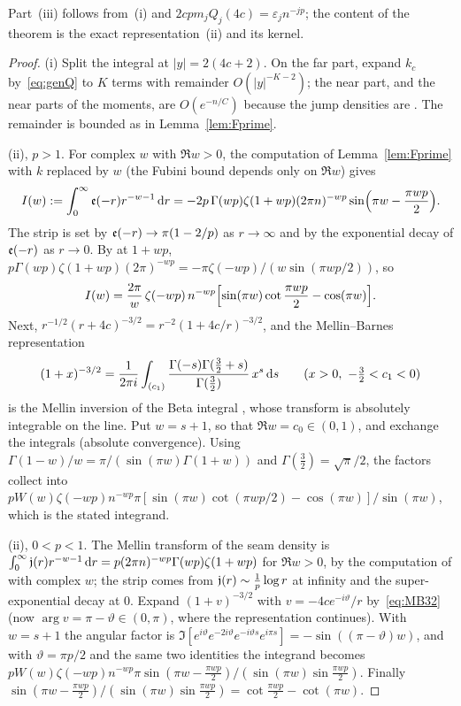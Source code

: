 Part~(iii) follows from~(i) and $2cpm_jQ_j(4c)=\varepsilon_jn^{-jp}$; the content of the theorem is the exact
representation~(ii) and its kernel.

\begin{proof}
(i) Split the integral at $|y|=2(4c+2)$. On the far part, expand $k_c$ by~\eqref{eq:genQ} to $K$ terms with remainder
$O(|y|^{-K-2})$; the near part, and the near parts of the moments, are $O(e^{-n/C})$ because the jump densities are
\cite[Lemmas~8.1(i) and~10.1]{PaperII}. The remainder is bounded as in Lemma~\ref{lem:Fprime}.

(ii), $p>1$. For complex $w$ with $\Re w>0$, the computation of Lemma~\ref{lem:Fprime} with $k$ replaced by $w$ (the
Fubini bound depends only on $\Re w$) gives
\[
  I(w):=\int_0^\infty\mathfrak e(-r)r^{-w-1}\,\mathrm{d} r=-2p\,\Gamma(wp)\zeta(1+wp)(2\pi n)^{-wp}\sin\Bigl(\pi w-\frac{\pi wp}2\Bigr).
\]
The strip is set by $\mathfrak e(-r)\to\pi(1-2/p)$ as $r\to\infty$ and by the exponential decay of $\mathfrak e(-r)$ as $r\to0$. By
\cite[(25.4.1)]{DLMF} at $1+wp$, $p\Gamma(wp)\zeta(1+wp)(2\pi)^{-wp}=-\pi\zeta(-wp)/(w\sin(\pi wp/2))$, so
\[
  I(w)=\frac{2\pi}w\,\zeta(-wp)\,n^{-wp}\Bigl[\sin(\pi w)\cot\frac{\pi wp}2-\cos(\pi w)\Bigr].
\]
Next, $r^{-1/2}(r+4c)^{-3/2}=r^{-2}(1+4c/r)^{-3/2}$, and the Mellin--Barnes representation
\begin{equation}\label{eq:MB32}
  (1+x)^{-3/2}=\frac1{2\pi i}\int_{(c_1)}\frac{\Gamma(-s)\Gamma(\frac32+s)}{\Gamma(\frac32)}\,x^s\,\mathrm{d} s\qquad
  (x>0,\ -\tfrac32<c_1<0)
\end{equation}
is the Mellin inversion of the Beta integral \cite[(5.12.3)]{DLMF}, whose transform is absolutely integrable on the line.
Put $w=s+1$, so that $\Re w=c_0\in(0,1)$, and exchange the integrals (absolute convergence). Using
$\Gamma(1-w)/w=\pi/(\sin(\pi w)\Gamma(1+w))$ and $\Gamma(\frac32)=\sqrt\pi/2$, the factors collect into
$pW(w)\zeta(-wp)n^{-wp}\pi[\sin(\pi w)\cot(\pi wp/2)-\cos(\pi w)]/\sin(\pi w)$, which is the stated integrand.

(ii), $0<p<1$. The Mellin transform of the seam density is $\int_0^\infty\mathfrak j(r)r^{-w-1}\,\mathrm{d} r=p(2\pi n)^{-wp}\Gamma(wp)\zeta(1+wp)$
for $\Re w>0$, by the computation of \cite[Lemma~10.1(iii)]{PaperII} with complex $w$; the strip comes from
$\mathfrak j(r)\sim\frac1p\log r$ at infinity and the super-exponential decay at $0$. Expand $(1+v)^{-3/2}$ with
$v=-4ce^{-i\vartheta}/r$ by~\eqref{eq:MB32} (now $\arg v=\pi-\vartheta\in(0,\pi)$, where the representation continues). With
$w=s+1$ the angular factor is $\Im[e^{i\vartheta}e^{-2i\vartheta}e^{-i\vartheta s}e^{i\pi s}]=-\sin((\pi-\vartheta)w)$, and with
$\vartheta=\pi p/2$ and the same two identities the integrand becomes
$pW(w)\zeta(-wp)n^{-wp}\pi\sin(\pi w-\frac{\pi wp}2)/(\sin(\pi w)\sin\frac{\pi wp}2)$. Finally
$\sin(\pi w-\frac{\pi wp}2)/(\sin(\pi w)\sin\frac{\pi wp}2)=\cot\frac{\pi wp}2-\cot(\pi w)$.


\end{proof}
